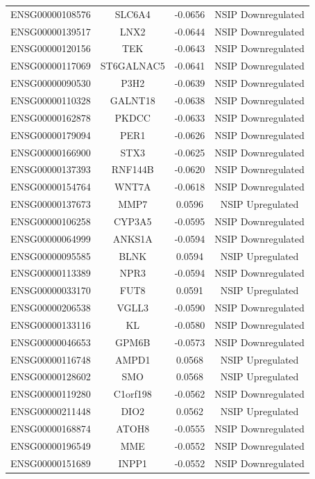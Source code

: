 \documentclass[
]{article}
\begin{document}
\begin{singlespace}
\begin{longtable}[t]{lccc}
\addlinespace
ENSG00000108576 & SLC6A4 & -0.0656 & NSIP Downregulated\\
ENSG00000139517 & LNX2 & -0.0644 & NSIP Downregulated\\
ENSG00000120156 & TEK & -0.0643 & NSIP Downregulated\\
ENSG00000117069 & ST6GALNAC5 & -0.0641 & NSIP Downregulated\\
ENSG00000090530 & P3H2 & -0.0639 & NSIP Downregulated\\
\addlinespace
ENSG00000110328 & GALNT18 & -0.0638 & NSIP Downregulated\\
ENSG00000162878 & PKDCC & -0.0633 & NSIP Downregulated\\
ENSG00000179094 & PER1 & -0.0626 & NSIP Downregulated\\
ENSG00000166900 & STX3 & -0.0625 & NSIP Downregulated\\
ENSG00000137393 & RNF144B & -0.0620 & NSIP Downregulated\\
\addlinespace
ENSG00000154764 & WNT7A & -0.0618 & NSIP Downregulated\\
ENSG00000137673 & MMP7 & 0.0596 & NSIP Upregulated\\
ENSG00000106258 & CYP3A5 & -0.0595 & NSIP Downregulated\\
ENSG00000064999 & ANKS1A & -0.0594 & NSIP Downregulated\\
ENSG00000095585 & BLNK & 0.0594 & NSIP Upregulated\\
\addlinespace
ENSG00000113389 & NPR3 & -0.0594 & NSIP Downregulated\\
ENSG00000033170 & FUT8 & 0.0591 & NSIP Upregulated\\
ENSG00000206538 & VGLL3 & -0.0590 & NSIP Downregulated\\
ENSG00000133116 & KL & -0.0580 & NSIP Downregulated\\
ENSG00000046653 & GPM6B & -0.0573 & NSIP Downregulated\\
\addlinespace
ENSG00000116748 & AMPD1 & 0.0568 & NSIP Upregulated\\
ENSG00000128602 & SMO & 0.0568 & NSIP Upregulated\\
ENSG00000119280 & C1orf198 & -0.0562 & NSIP Downregulated\\
ENSG00000211448 & DIO2 & 0.0562 & NSIP Upregulated\\
ENSG00000168874 & ATOH8 & -0.0555 & NSIP Downregulated\\
\addlinespace
ENSG00000196549 & MME & -0.0552 & NSIP Downregulated\\
ENSG00000151689 & INPP1 & -0.0552 & NSIP Downregulated\\

\end{longtable}
\end{singlespace}
\end{document}
